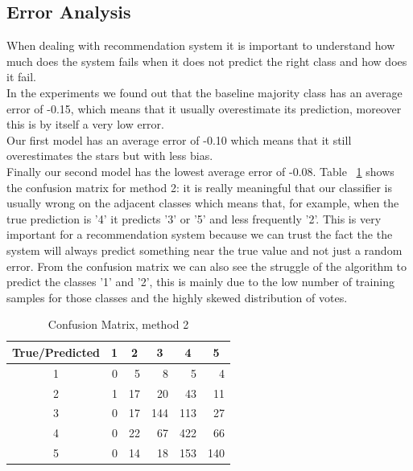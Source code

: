 \documentclass[11pt]{article}
\begin{document}
\subsection{Error Analysis}
When dealing with recommendation system it is important to understand how much does the system fails when it does not predict the right class and how does it fail.\\
In the experiments we found out that the baseline majority class has an average error of -0.15, which means that it usually overestimate its prediction, moreover this is by itself a very low error.\\
Our first model has an average error of -0.10 which means that it still overestimates the stars but with less bias.\\
Finally our second model has the lowest average error of -0.08.
Table ~\ref{conf} shows the confusion matrix for method 2: it is really meaningful that our classifier is usually wrong on the adjacent classes which means that, for example, when the true prediction is '4' it predicts '3' or '5' and less frequently '2'. This is very important for a recommendation system because we can trust the fact the the system will always predict something near the true value and not just a random error.
From the confusion matrix we can also see the struggle of the algorithm to predict the classes '1' and '2', this is mainly due to the low number of training samples for those classes and the highly skewed distribution of votes.
\begin{table}[]
	\centering
	\caption{Confusion Matrix, method 2}
	\label{conf}
	\begin{tabular}{|c|r|r|r|r|r|}
		\hline
		True/Predicted & \multicolumn{1}{c|}{1} & \multicolumn{1}{c|}{2} & \multicolumn{1}{c|}{3} & \multicolumn{1}{c|}{4} & \multicolumn{1}{c|}{5} \\ \hline
		1              & 0                      & 5                      & 8                      & 5                      & 4                      \\ \hline
		2              & 1                      & 17                     & 20                     & 43                     & 11                     \\ \hline
		3              & 0                      & 17                     & 144                    & 113                    & 27                     \\ \hline
		4              & 0                      & 22                     & 67                     & 422                    & 66                     \\ \hline
		5              & 0                      & 14                     & 18                     & 153                    & 140                    \\ \hline
	\end{tabular}
\end{table}
\end{document}
